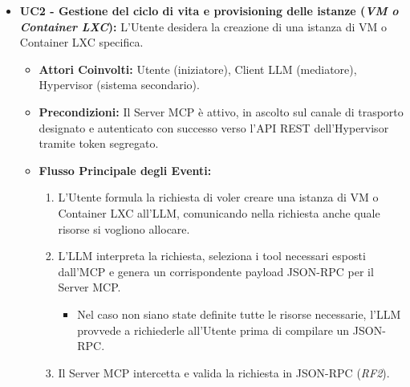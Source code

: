 \begin{itemize}
\begin{itemize}
\begin{enumerate}
\begin{itemize}
            \end{itemize}
            \item Il Server MCP estrae e normalizza i dati salienti, restituendoli al Client LLM sotto forma di \textit{Observation} strutturata (\textit{RF3, RF4}).
            \item Il Client LLM sintetizza i dati ricevuti e genera la risposta in linguaggio naturale per l'Utente.
        \end{enumerate}
        \item \textbf{Postcondizioni:} Nessuna modifica di stato viene apportata all'infrastruttura; l'operazione di lettura e le relative chiamate API vengono registrate nel log di sistema (\textit{RF5}).
    \end{itemize}

    \item \textbf{UC2 - Gestione del ciclo di vita e provisioning delle istanze (\textit{VM o Container LXC}):}
    L'Utente desidera la creazione di una istanza di VM o Container LXC specifica.
    \begin{itemize}
        \item \textbf{Attori Coinvolti:} Utente (iniziatore), Client LLM (mediatore), Hypervisor (sistema secondario).
        \item \textbf{Precondizioni:} Il Server MCP è attivo, in ascolto sul canale di trasporto designato e autenticato con successo verso l'API REST dell'Hypervisor tramite token segregato.
        \item \textbf{Flusso Principale degli Eventi:}
        \begin{enumerate}
            \item L'Utente formula la richiesta di voler creare una istanza di VM o Container LXC all'LLM, comunicando nella richiesta anche quale risorse si vogliono allocare.
            \item L'LLM interpreta la richiesta, seleziona i tool necessari esposti dall'MCP e genera un corrispondente payload JSON-RPC per il Server MCP.
            \begin{itemize}
                \item Nel caso non siano state definite tutte le risorse necessarie, l'LLM provvede a richiederle all'Utente prima di compilare un JSON-RPC.
            \end{itemize}
            \item Il Server MCP intercetta e valida la richiesta in JSON-RPC (\textit{RF2}).
            \begin{itemize}

\end{itemize}
\end{enumerate}
\end{itemize}
\end{itemize}

